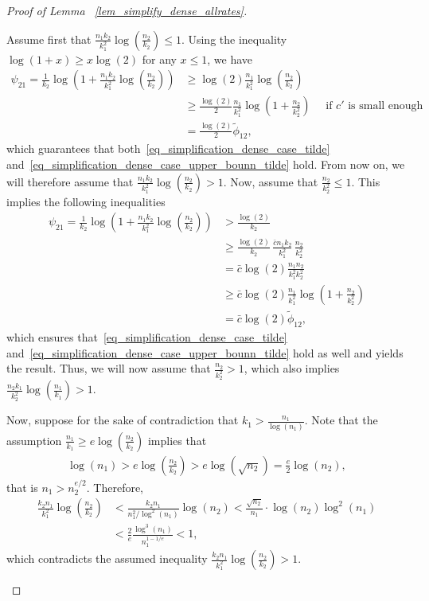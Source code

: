 \documentclass{article}
\begin{document}
\begin{proof}[Proof of Lemma ~\ref{lem_simplify_dense_allrates}]
\begin{enumerate}
    Assume first that $\frac{n_1k_2}{k_1^2} \log\left(\frac{n_2}{k_2}\right) \leq 1$. 
    Using the inequality $\log(1+x) \geq x\log(2) $ for any $x \leq 1$, we have 
    \begin{align*}
        \psi_{21} = \frac{1}{k_2} \log\left(1+\frac{n_1k_2}{k_1^2} \log\left(\frac{n_2}{k_2}\right)\right) &\geq \log(2) \frac{n_1}{k_1^2} \log\left(\frac{n_2}{k_2}\right)\\
        & \geq \frac{\log(2)}{2} \frac{n_1}{k_1^2} \log\left(1+\frac{n_2}{k_2^2}\right) \quad \text{ if $c'$ is small enough}\\
        & = \frac{\log(2)}{2} \widetilde \phi_{12},
    \end{align*}
    which guarantees that both~\eqref{eq_simplification_dense_case_tilde} and~\eqref{eq_simplification_dense_case_upper_bounn_tilde} hold. 
    From now on, we will therefore assume that $\frac{n_1k_2}{k_1^2} \log\left(\frac{n_2}{k_2}\right) > 1$. 
    Now, assume that $\frac{n_2}{k_2^2} \leq 1$. 
    This implies the following inequalities   
    \begin{align*}
        \psi_{21} = \frac{1}{k_2} \log\left(1+\frac{n_1k_2}{k_1^2} \log\left(\frac{n_2}{k_2}\right)\right) &>\frac{\log(2)}{k_2} \\
        & \geq \frac{\log(2)}{k_2} \, \frac{\bar c n_1k_2}{k_1^2} \, \frac{n_2}{k_2^2} \\
        & = \bar c \log(2) \frac{n_1n_2}{k_1^2 k_2^2} \\
        & \geq \bar c \log(2) \frac{n_1}{k_1^2} \log\left(1+\frac{n_2}{k_2^2}\right)\\
        & = \bar c \log(2) \widetilde \phi_{12},
    \end{align*}
    which ensures that~\eqref{eq_simplification_dense_case_tilde} and~\eqref{eq_simplification_dense_case_upper_bounn_tilde} hold as well and yields the result. 
    Thus, we will now assume that $\frac{n_2}{k_2^2}>1$, which also implies $\frac{n_2k_1}{k_2^2} \log\left(\frac{n_1}{k_1}\right)>1$.


    Now, suppose for the sake of contradiction that $k_1 > \frac{n_1}{\log(n_1)}$. 
    Note that the assumption $\frac{n_1}{k_1} \geq e \log\left(\frac{n_2}{k_2}\right)$ implies that
    \begin{align*}
        \log(n_1) > e\log\left(\frac{n_2}{k_2}\right) > e\log(\sqrt{n_2}) = \frac{e}{2} \log(n_2),
    \end{align*}
    that is $n_1 > n_2^{e/2}.$ Therefore, 
    \begin{align*}
        \frac{k_2 n_1}{k_1^2} \log\left(\frac{n_2}{k_2}\right) &< \frac{k_2n_1}{n_1^2/\log^2(n_1)}\log\left(n_2\right) < \frac{\sqrt{n_2}}{n_1 }\cdot \log(n_2)\log^2(n_1)\\
        & < \frac{2}{e}\frac{\log^3(n_1)}{n_1^{1-1/e}} <1,
    \end{align*}
    which contradicts the assumed inequality $ \frac{k_2 n_1}{k_1^2} \log\left(\frac{n_2}{k_2}\right)>1$. 


\end{enumerate}
\end{proof}
\end{document}
